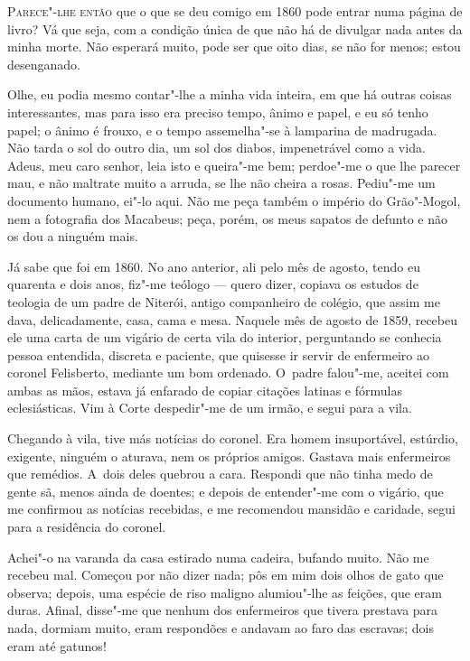 \begin{linenumbers}

\textsc{Parece"-lhe então} que o que se deu comigo em 1860 pode entrar numa página
de livro? Vá que seja, com a condição única de que não há de divulgar
nada antes da minha morte. Não esperará muito, pode ser que oito dias,
se não for menos; estou desenganado.

Olhe, eu podia mesmo contar"-lhe a minha vida inteira, em que há outras
coisas interessantes, mas para isso era preciso tempo, ânimo e papel, e
eu só tenho papel; o ânimo é frouxo, e o tempo assemelha"-se à lamparina
de madrugada. Não tarda o sol do outro dia, um sol dos diabos,
impenetrável como a vida. Adeus, meu caro senhor, leia isto e queira"-me
bem; perdoe"-me o que lhe parecer mau, e não maltrate muito a arruda, se
lhe não cheira a rosas. Pediu"-me um documento humano, ei"-lo aqui. Não me
peça também o império do Grão"-Mogol, nem a fotografia dos Macabeus;
peça, porém, os meus sapatos de defunto e não os dou a ninguém mais.

Já sabe que foi em 1860. No ano anterior, ali pelo mês de agosto, tendo
eu quarenta e dois anos, fiz"-me teólogo --- quero dizer, copiava os
estudos de teologia de um padre de Niterói, antigo companheiro de
colégio, que assim me dava, delicadamente, casa, cama e mesa. Naquele
mês de agosto de 1859, recebeu ele uma carta de um vigário de certa vila
do interior, perguntando se conhecia pessoa entendida, discreta e
paciente, que quisesse ir servir de enfermeiro ao coronel Felisberto,
mediante um bom ordenado. O~padre falou"-me, aceitei com ambas as mãos,
estava já enfarado de copiar citações latinas e fórmulas eclesiásticas.
Vim à Corte despedir"-me de um irmão, e segui para a vila.

Chegando à vila, tive más notícias do coronel. Era homem insuportável,
estúrdio, exigente, ninguém o aturava, nem os próprios amigos. Gastava
mais enfermeiros que remédios. A~dois deles quebrou a cara. Respondi que
não tinha medo de gente sã, menos ainda de doentes; e depois de
entender"-me com o vigário, que me confirmou as notícias recebidas, e me
recomendou mansidão e caridade, segui para a residência do coronel.

Achei"-o na varanda da casa estirado numa cadeira, bufando muito. Não me
recebeu mal. Começou por não dizer nada; pôs em mim dois olhos de gato
que observa; depois, uma espécie de riso maligno alumiou"-lhe as feições,
que eram duras. Afinal, disse"-me que nenhum dos enfermeiros que tivera
prestava para nada, dormiam muito, eram respondões e andavam ao faro das
escravas; dois eram até gatunos!


\end{linenumbers}

